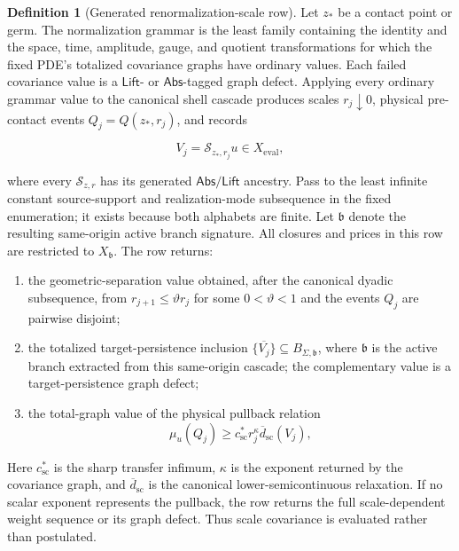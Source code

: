 \documentclass[11pt]{article}
\numberwithin{section}{part}
\theoremstyle{plain}
\theoremstyle{definition}
\newtheorem{definition}[definition]{Definition}
\theoremstyle{remark}
\newcommand{\Abs}{\mathsf{Abs}}
\newcommand{\Lift}{\mathsf{Lift}}
\begin{document}
\begin{definition}[Generated renormalization-scale row]
\label{def:renormalization-scale-interface}
Let \(z_*\) be a contact point or germ.  The normalization grammar is the
least family containing the identity and the space, time, amplitude, gauge,
and quotient transformations for which the fixed PDE's totalized covariance
graphs have ordinary values.  Each failed covariance value is a \(\Lift\)- or
\(\Abs\)-tagged graph defect.  Applying every ordinary grammar value to the
canonical shell cascade produces scales \(r_j\downarrow0\), physical
pre-contact events \(Q_j=Q(z_*,r_j)\), and records

\[
 V_j=\mathcal S_{z_*,r_j}u\in X_{\mathrm{eval}},
\]

where every \(\mathcal S_{z,r}\) has its generated \(\Abs/\Lift\) ancestry.
Pass to the least infinite constant source-support and realization-mode
subsequence in the fixed enumeration; it exists because both alphabets are
finite.  Let \(\mathfrak b\) denote the resulting same-origin active branch
signature.  All closures and prices in this row are restricted to
\(X_{\mathfrak b}\).
The row returns:
\begin{enumerate}[label=\textup{(R\arabic*)}]
\item the geometric-separation value obtained, after the canonical dyadic
  subsequence, from
  \(r_{j+1}\le\vartheta r_j\) for some \(0<\vartheta<1\) and the events
  \(Q_j\) are pairwise disjoint;
\item the totalized target-persistence inclusion
  \(\overline{\{V_j\}}\subseteq B_{\Sigma,\mathfrak b}\), where
  \(\mathfrak b\) is the active branch extracted from this same-origin
  cascade; the complementary value is a target-persistence graph defect;
\item the total-graph value of the physical pullback relation
  \begin{equation}
   \label{eq:physical-scale-pullback}
   \mu_u(Q_j)\ge
   c_{\mathrm{sc}}^*r_j^{\kappa}
   \overline d_{\mathrm{sc}}(V_j),
  \end{equation}
\end{enumerate}
Here \(c_{\mathrm{sc}}^*\) is the sharp transfer infimum, \(\kappa\) is the
exponent returned by the covariance graph, and
\(\overline d_{\mathrm{sc}}\) is the canonical lower-semicontinuous
relaxation.  If no scalar exponent represents the pullback, the row returns
the full scale-dependent weight sequence or its graph defect.  Thus scale
covariance is evaluated rather than postulated.
\end{definition}
\end{document}
